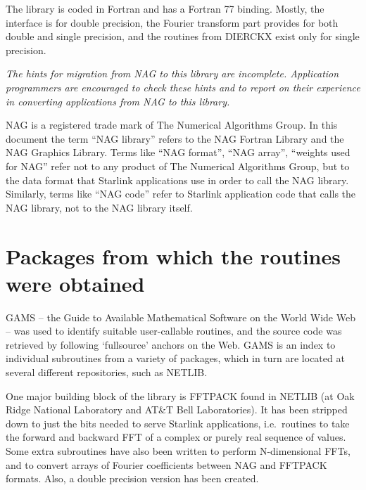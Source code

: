 \documentclass[11pt,twoside]{article}
\newcommand{\htmladdnormallink}[2]{#1}
\newcommand{\xlabel}[1]{}
\begin{document}
   The library is coded in Fortran and has a Fortran 77 binding. Mostly,
   the interface is for double precision, the Fourier transform part
   provides for both double and single precision, and the routines from
   DIERCKX exist only for single precision.

{\em
   The hints for migration from NAG to this library are incomplete.
   Application programmers are encouraged to check these hints and to
   report on their experience in converting applications from NAG to
   this library.

   NAG is a registered trade mark of The Numerical Algorithms Group. In
   this document the term ``NAG library'' refers to the
\htmladdnormallink{NAG Fortran Library}{http://www.nag.co.uk/1h/numeric/FLOLCH}
   and the
\htmladdnormallink{NAG Graphics Library.}{http://www.nag.co.uk/1h/visual/GLGICH}
   Terms like ``NAG format'', ``NAG array'', ``weights used for NAG''
   refer not to any product of The Numerical Algorithms Group, but to
   the data format that Starlink applications use in order to call the
   NAG library. Similarly, terms like ``NAG code'' refer to Starlink
   application code that calls the NAG library, not to the NAG library
   itself.
\/}


\section{\xlabel{packages_from_which_the_routines_were_obtained}Packages from which the routines were obtained}

   GAMS -- the
\htmladdnormallink{Guide to Available Mathematical Software}
{http://gams.nist.gov/}
   on the World Wide Web -- was used to identify suitable user-callable
   routines, and the source code was retrieved by following `fullsource'
   anchors on the Web. GAMS is an index to individual subroutines from a
   variety of packages, which in turn are located at several different
   repositories, such as NETLIB.

   One major building block of the library is FFTPACK found in NETLIB (at
   Oak Ridge National Laboratory and AT\&T Bell Laboratories).
   It has been stripped down to just the bits needed to serve Starlink
   applications, i.e.\ routines to take the forward and backward FFT
   of a complex or purely real sequence of values. Some extra
   subroutines have also been written to perform N-dimensional FFTs, and
   to convert arrays of Fourier coefficients between NAG and FFTPACK
   formats. Also, a double precision version has been created.
\end{document}
